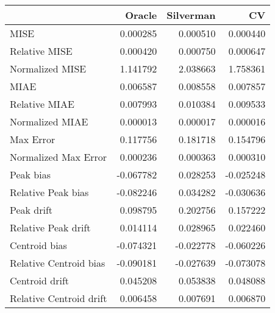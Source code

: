 \begin{tabular}{lrrr}
  \hline
 & Oracle & Silverman & CV \\ 
  \hline
MISE & 0.000285 & 0.000510 & 0.000440 \\ 
  Relative MISE & 0.000420 & 0.000750 & 0.000647 \\ 
  Normalized MISE & 1.141792 & 2.038663 & 1.758361 \\ 
  MIAE & 0.006587 & 0.008558 & 0.007857 \\ 
  Relative MIAE & 0.007993 & 0.010384 & 0.009533 \\ 
  Normalized MIAE & 0.000013 & 0.000017 & 0.000016 \\ 
  Max Error & 0.117756 & 0.181718 & 0.154796 \\ 
  Normalized Max Error & 0.000236 & 0.000363 & 0.000310 \\ 
  Peak bias & -0.067782 & 0.028253 & -0.025248 \\ 
  Relative Peak bias & -0.082246 & 0.034282 & -0.030636 \\ 
  Peak drift & 0.098795 & 0.202756 & 0.157222 \\ 
  Relative Peak drift & 0.014114 & 0.028965 & 0.022460 \\ 
  Centroid bias & -0.074321 & -0.022778 & -0.060226 \\ 
  Relative Centroid bias & -0.090181 & -0.027639 & -0.073078 \\ 
  Centroid drift & 0.045208 & 0.053838 & 0.048088 \\ 
  Relative Centroid drift & 0.006458 & 0.007691 & 0.006870 \\ 
   \hline
\end{tabular}
